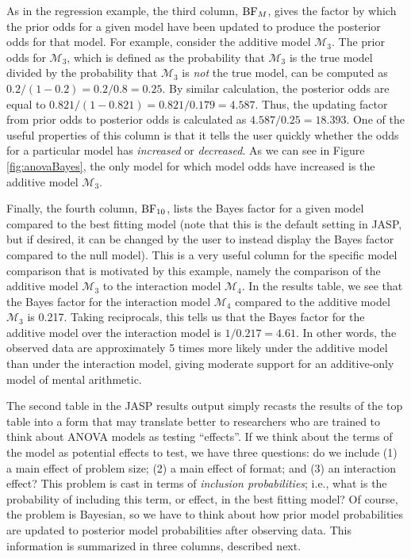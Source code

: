 \documentclass[english,,doc,floatsintext]{apa6}
\begin{document}
As in the regression example, the third column, \(\textnormal{BF}_{M}\), gives the factor by which the prior odds for a given model have been updated to produce the posterior odds for that model. For example, consider the additive model \(\mathcal{M}_{3}\). The prior odds for \(\mathcal{M}_{3}\), which is defined as the probability that \(\mathcal{M}_{3}\) is the true model divided by the probability that \(\mathcal{M}_{3}\) is \emph{not} the true model, can be computed as \(0.2/(1-0.2) = 0.2/0.8 = 0.25\). By similar calculation, the posterior odds are equal to \(0.821/(1-0.821) = 0.821/0.179 = 4.587\). Thus, the updating factor from prior odds to posterior odds is calculated as \(4.587/0.25 = 18.393\). One of the useful properties of this column is that it tells the user quickly whether the odds for a particular model has \emph{increased} or \emph{decreased}. As we can see in Figure \ref{fig:anovaBayes}, the only model for which model odds have increased is the additive model \(\mathcal{M}_{3}\).

Finally, the fourth column, \(\textnormal{BF}_{10}\), lists the Bayes factor for a given model compared to the best fitting model (note that this is the default setting in JASP, but if desired, it can be changed by the user to instead display the Bayes factor compared to the null model). This is a very useful column for the specific model comparison that is motivated by this example, namely the comparison of the additive model \(\mathcal{M}_{3}\) to the interaction model \(\mathcal{M}_{4}\). In the results table, we see that the Bayes factor for the interaction model \(\mathcal{M}_{4}\) compared to the additive model \(\mathcal{M}_{3}\) is 0.217. Taking reciprocals, this tells us that the Bayes factor for the additive model over the interaction model is \(1/0.217 = 4.61\). In other words, the observed data are approximately 5 times more likely under the additive model than under the interaction model, giving moderate support for an additive-only model of mental arithmetic.

The second table in the JASP results output simply recasts the results of the top table into a form that may translate better to researchers who are trained to think about ANOVA models as testing ``effects''. If we think about the terms of the model as potential effects to test, we have three questions: do we include (1) a main effect of problem size; (2) a main effect of format; and (3) an interaction effect? This problem is cast in terms of \emph{inclusion probabilities}; i.e., what is the probability of including this term, or effect, in the best fitting model? Of course, the problem is Bayesian, so we have to think about how prior model probabilities are updated to posterior model probabilities after observing data. This information is summarized in three columns, described next.
\end{document}
